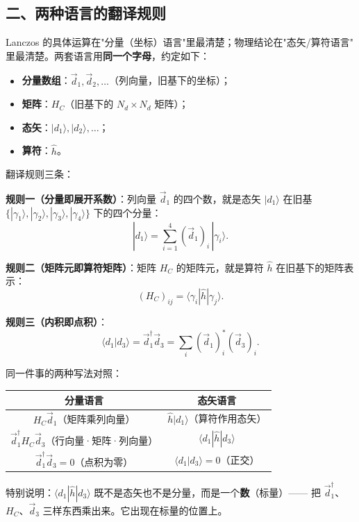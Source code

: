 \documentclass[11pt]{ctexart}
\begin{document}
\subsection{二、两种语言的翻译规则}

Lanczos 的具体运算在"分量（坐标）语言"里最清楚；物理结论在"态矢/算符语言"
里最清楚。两套语言用\textbf{同一个字母}，约定如下：

\begin{itemize}
\item \textbf{分量数组}：$\vec d_1,\vec d_2,\dots$（列向量，旧基下的坐标）；
\item \textbf{矩阵}：$H_C$（旧基下的 $N_d\times N_d$ 矩阵）；
\item \textbf{态矢}：$|d_1\rangle,|d_2\rangle,\dots$；
\item \textbf{算符}：$\hat h$。
\end{itemize}

翻译规则三条：

\textbf{规则一（分量即展开系数）}：列向量 $\vec d_1$ 的四个数，就是态矢 $|d_1\rangle$
在旧基 $\{|\gamma_1\rangle,|\gamma_2\rangle,|\gamma_3\rangle,|\gamma_4\rangle\}$ 下的四个分量：
\[
|d_1\rangle=\sum_{i=1}^{4}(\vec d_1)_i\,|\gamma_i\rangle .
\]

\textbf{规则二（矩阵元即算符矩阵）}：矩阵 $H_C$ 的矩阵元，就是算符 $\hat h$ 在旧基下的矩阵表示：
\[
(H_C)_{ij}=\langle\gamma_i|\hat h|\gamma_j\rangle .
\]

\textbf{规则三（内积即点积）}：
\[
\langle d_1|d_3\rangle=\vec d_1^{\dagger}\vec d_3=\sum_i(\vec d_1)_i^{*}(\vec d_3)_i .
\]

同一件事的两种写法对照：

\begin{center}
\begin{tabular}{c|c}
\toprule
分量语言 & 态矢语言\\
\midrule
$H_C\vec d_1$（矩阵乘列向量） & $\hat h|d_1\rangle$（算符作用态矢）\\[2pt]
$\vec d_1^{\dagger}H_C\vec d_3$（行向量·矩阵·列向量） & $\langle d_1|\hat h|d_3\rangle$\\[2pt]
$\vec d_1^{\dagger}\vec d_3=0$（点积为零） & $\langle d_1|d_3\rangle=0$（正交）\\
\bottomrule
\end{tabular}
\end{center}

特别说明：$\langle d_1|\hat h|d_3\rangle$ 既不是态矢也不是分量，而是一个\textbf{数}（标量）——
把 $\vec d_1^{\dagger}$、$H_C$、$\vec d_3$ 三样东西乘出来。它出现在标量的位置上。
\end{document}
